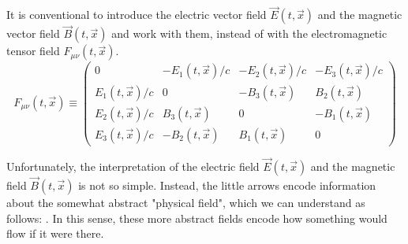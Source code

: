 It is conventional to introduce the electric vector field $\vec{E}(t, \vec{x})$ and the magnetic vector field $\vec{B}(t, \vec{x})$ and work with them, instead of with the electromagnetic tensor field $F_{\mu \nu}(t, \vec{x})$.
\begin{equation}
F_{\mu \nu}(t, \vec{x})\equiv\left(\begin{array}{cccc}
{0} & {-E_{1}(t, \vec{x}) / c} & {-E_{2}(t, \vec{x}) / c} & {-E_{3}(t, \vec{x}) / c} \\
{E_{1}(t, \vec{x}) / c} & {0} & {-B_{3}(t, \vec{x})} & {B_{2}(t, \vec{x})} \\
{E_{2}(t, \vec{x}) / c} & {B_{3}(t, \vec{x})} & {0} & {-B_{1}(t, \vec{x})} \\
{E_{3}(t, \vec{x}) / c} & {-B_{2}(t, \vec{x})} & {B_{1}(t, \vec{x})} & {0}
\end{array}\right)
\end{equation}

Unfortunately, the interpretation of the electric field $\vec{E}(t, \vec{x})$ and the magnetic field $\vec{B}(t, \vec{x})$ is not so simple. Instead, the little arrows encode information about the somewhat abstract "physical field", which we can understand as follows: . In this sense, these more abstract fields encode how something would flow if it were there.
